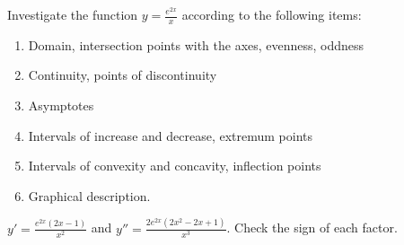 
\begin{question}
Investigate the function $y=\frac{e^{2x}}{x}$ according to the following items:
\begin{enumerate}
  \item Domain, intersection points with the axes, evenness, oddness
  \item Continuity, points of discontinuity
  \item Asymptotes
  \item Intervals of increase and decrease, extremum points
  \item Intervals of convexity and concavity, inflection points
  \item Graphical description.
\end{enumerate}
\end{question}

\begin{hint}
$y'=\frac{e^{2x}(2x-1)}{x^2}$ and $y''=\frac{2e^{2x}(2x^2-2x+1)}{x^3}$. Check the sign of each factor.
\end{hint}

